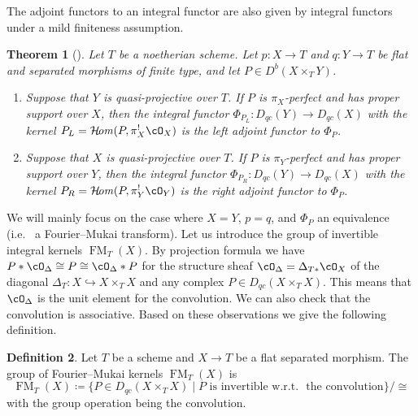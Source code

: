 \documentclass{amsart}
\numberwithin{equation}{section}
\theoremstyle{plain}
\newtheorem{theorem}{Theorem}[section]
\theoremstyle{definition}
\newtheorem{definition}[theorem]{Definition}
\DeclareMathOperator{\CHom}{\mathcal{H}\!\mathit{om}}
\DeclareMathOperator{\FM}{\mathrm{FM}}
\begin{document}
The adjoint functors to an integral functor are also given by integral functors under a mild finiteness assumption.
\begin{theorem}[{\cite{MR3720794}}]\label{thm:adjoint-to-integral-functors}
    Let $T$ be a noetherian scheme.
    Let $p \colon X \to T$ and $q \colon Y \to T$ be flat and separated morphisms of finite type, and let $P \in D^b(X \times_T Y)$.
    \begin{enumerate}
        \item Suppose that $Y$ is quasi-projective over $T$. If $P$ is $\pi_X$-perfect and has proper support over $X$, then the integral functor $\Phi_{P_L} \colon D_{qc}(Y) \to D_{qc}(X)$ with the kernel $P_L = \CHom(P, \pi_X^!\cO_X)$ is the left adjoint functor to $\Phi_P$.
        \item Suppose that $X$ is quasi-projective over $T$. If $P$ is $\pi_Y$-perfect and has proper support over $Y$, then the integral functor $\Phi_{P_R} \colon D_{qc}(Y) \to D_{qc}(X)$ with the kernel $P_R = \CHom(P, \pi_Y^!\cO_Y)$ is the right adjoint functor to $\Phi_P$.
    \end{enumerate}
\end{theorem}


We will mainly focus on the case where $X = Y$, $p = q$, and $\Phi_P$ an equivalence (i.e.~ a Fourier--Mukai transform).
Let us introduce the group of invertible integral kernels $\FM_T(X)$.
By projection formula we have $P * \cO_{\Delta} \cong P \cong \cO_{\Delta} * P$ for the structure sheaf $\cO_{\Delta} = \Delta_{T*}\cO_X$ of the diagonal $\Delta_T \colon X \hookrightarrow X \times_T X$ and any complex $P \in D_{qc}(X \times_T X)$.
This means that $\cO_{\Delta}$ is the unit element for the convolution.
We can also check that the convolution is associative.
Based on these observations we give the following definition.
\begin{definition}
    Let $T$ be a scheme and $X \to T$ be a flat separated morphism.
    The group of Fourier--Mukai kernels $\FM_T(X)$ is
    \begin{equation}
        \FM_T(X) \coloneqq \{P \in D_{qc}(X \times_T X) \mid \text{$P$ is invertible w.r.t.~ the convolution}\}/\cong
    \end{equation}
    with the group operation being the convolution.
\end{definition}
\end{document}

